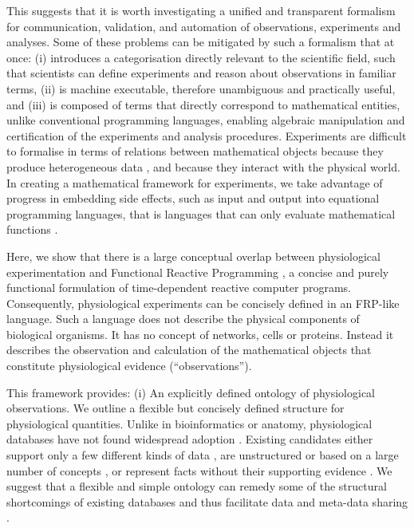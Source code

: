 This suggests that it is worth investigating a unified and transparent
formalism for communication, validation, and automation of
observations, experiments and analyses. Some of these problems can be
mitigated by such a formalism that at once: (i) introduces a
categorisation directly relevant to the scientific field, such that
scientists can define experiments and reason about observations in
familiar terms, (ii) is machine executable, therefore unambiguous and
practically useful, and (iii) is composed of terms that directly
correspond to mathematical entities, unlike conventional programming
languages, enabling algebraic manipulation and certification of the
experiments and analysis procedures.  Experiments are difficult to
formalise in terms of relations between mathematical objects because
they produce heterogeneous data \citep{Tukey1962}, and because they
interact with the physical world. In creating a mathematical framework
for experiments, we take advantage of progress in embedding side
effects, such as input and output \citep{PeytonJones2002, Roy2004,
  Wadler1995} into equational programming languages, that is languages
that can only evaluate mathematical functions \citep{Church1941}.

Here, we show that there is a large conceptual overlap between
physiological experimentation and Functional Reactive Programming
\citep[FRP;][]{Elliott1997, Nilsson2002}, a concise and purely
functional formulation of time-dependent reactive computer
programs. Consequently, physiological experiments can be concisely
defined in an FRP-like language. Such a language does not describe the
physical components of biological organisms. It has no concept of
networks, cells or proteins. Instead it describes the observation and
calculation of the mathematical objects that constitute physiological
evidence (``observations'').

This framework provides:
(i) An explicitly defined ontology of physiological observations. We
outline a flexible but concisely defined structure for physiological
quantities.  Unlike in bioinformatics or anatomy, physiological
databases have not found widespread adoption \citep{Herz2008,
  Amari2002}. Existing candidates either support only a few different
kinds of data \citep{Jessop2010}, are unstructured \citep{Teeters2008}
or based on a large number of concepts \citep{Frishkoff2009}, or
represent facts without their supporting evidence \citep{Katz2010}.
We suggest that a flexible and simple ontology
can remedy some of the structural shortcomings of existing databases
\citep{Gardner2005, Amari2002} and thus facilitate data and meta-data
sharing \citep{Insel2003}.

